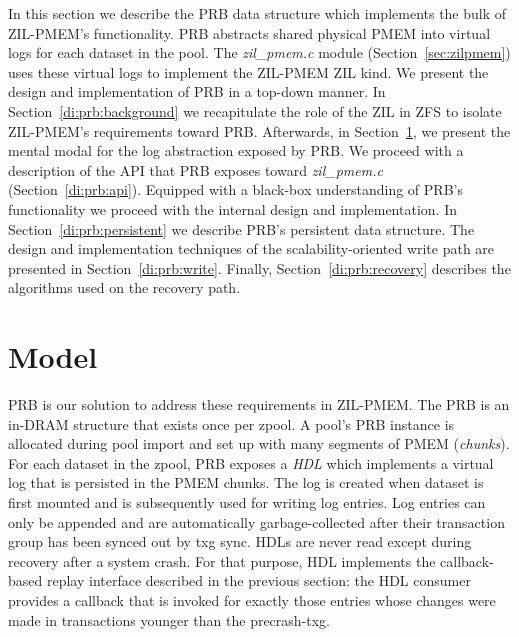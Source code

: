 \documentclass[12pt,a4paper,twoside]{book}
\begin{document}
In this section we describe the PRB data structure which implements the bulk of ZIL-PMEM's functionality.
PRB abstracts shared physical PMEM into virtual logs for each dataset in the pool.
The \textit{zil\_pmem.c} module (Section~\ref{sec:zilpmem}) uses these virtual logs to implement the ZIL-PMEM ZIL kind.
We present the design and implementation of PRB in a top-down manner.
In Section~\ref{di:prb:background} we recapitulate the role of the ZIL in ZFS to isolate ZIL-PMEM's requirements toward PRB.
Afterwards, in Section~\ref{di:prb:structure}, we present the mental modal for the log abstraction exposed by PRB.
We proceed with a description of the API that PRB exposes toward \textit{zil\_pmem.c} (Section~\ref{di:prb:api}).
Equipped with a black-box understanding of PRB's functionality we proceed with the internal design and implementation.
In Section~\ref{di:prb:persistent} we describe PRB's persistent data structure.
The design and implementation techniques of the scalability-oriented write path are presented in Section~\ref{di:prb:write}.
Finally, Section~\ref{di:prb:recovery} describes the algorithms used on the recovery path.


\section{Model}\label{di:prb:structure}


PRB is our solution to address these requirements in ZIL-PMEM.
The PRB is an in-DRAM structure that exists once per zpool.
A pool's PRB instance is allocated during pool import and set up with many segments of PMEM (\textit{chunks}).
For each dataset in the zpool, PRB exposes a \textit{HDL} which implements a virtual log that is persisted in the PMEM chunks.
The log is created when dataset is first mounted and is subsequently used for writing log entries.
Log entries can only be appended and are automatically garbage-collected after their transaction group has been synced out by txg sync.
HDLs are never read except during recovery after a system crash.
For that purpose, HDL implements the callback-based replay interface described in the previous section:
the HDL consumer provides a callback that is invoked for exactly those entries whose changes were made in transactions younger than the precrash-txg.
\end{document}
